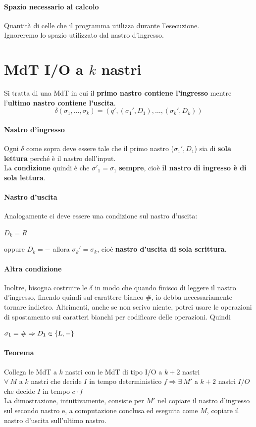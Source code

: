 \documentclass[10pt]{book}
\begin{document}
\paragraph{Spazio necessario al calcolo} Quantità di celle che il programma utilizza durante l'esecuzione.\\
Ignoreremo lo spazio utilizzato dal nastro d'ingresso.
\section{MdT I/O a $k$ nastri}
Si tratta di una MdT in cui il \textbf{primo nastro contiene l'ingresso} mentre l'\textbf{ultimo nastro contiene l'uscita}.
$$\delta(\sigma_1, \ldots, \sigma_k) = (q', (\sigma_1', D_1), \ldots, (\sigma_k', D_k))$$
\paragraph{Nastro d'ingresso} Ogni $\delta$ come sopra deve essere tale che il primo nastro ($\sigma_1', D_1$) sia di \textbf{sola lettura} perché è il nastro dell'input.\\
La \textbf{condizione} quindi è che $\sigma'_1 = \sigma_1$ \textbf{sempre}, cioè \textbf{il nastro di ingresso è di sola lettura}.
\paragraph{Nastro d'uscita} Analogamente ci deve essere una condizione sul nastro d'uscita:
\begin{list}{}{}
	\item $D_k = R$
	\item oppure $D_k = -$ allora $\sigma_k' = \sigma_k$, cioè \textbf{nastro d'uscita di sola scrittura}.
\end{list}
\paragraph{Altra condizione} Inoltre, bisogna costruire le $\delta$ in modo che quando finisco di leggere il nastro d'ingresso, finendo quindi sul carattere bianco $\#$, io debba necessariamente tornare indietro. Altrimenti, anche se non scrivo niente, potrei usare le operazioni di spostamento sui caratteri bianchi per codificare delle operazioni. Quindi \begin{list}{}{}
	\item $\sigma_1 = \# \Rightarrow D_1 \in \{\textsl{L}, -\}$
\end{list}
\paragraph{Teorema} Collega le MdT a $k$ nastri con le MdT di tipo I/O a $k+2$ nastri\\$\forall\:M$ a $k$ nastri che decide $I$ in tempo deterministico $f\Rightarrow\exists\:M'$ a $k+2$ nastri $I/O$ che decide $I$ in tempo $c\cdot f$\\
La dimostrazione, intuitivamente, consiste per $M'$ nel copiare il nastro d'ingresso sul secondo nastro e, a computazione conclusa ed eseguita come $M$, copiare il nastro d'uscita sull'ultimo nastro.
\end{document}
